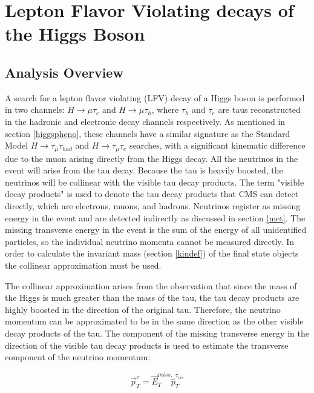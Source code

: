 \documentclass[oneside, letterpaper, oldfontcommands]{memoir}
\begin{document}
\chapter{Lepton Flavor Violating decays of the Higgs Boson}\label{lfv}

\section{Analysis Overview}\label{lfvoverview}
\qquad A search for a lepton flavor violating (LFV) decay of a Higgs boson is performed in two channels: $H \rightarrow \mu\tau_{e}$ and $H \rightarrow \mu\tau_{h}$, where $\tau_{h}$ and $\tau_{e}$ are taus reconstructed in the hadronic and electronic decay channels respectively. As mentioned in section \ref{higgspheno}, these channels have a similar signature as the Standard Model $H \rightarrow \tau_{\mu} \tau_{had}$ and $H \rightarrow \tau_{\mu}\tau_{e}$ searches, with a significant kinematic difference due to the muon arising directly from the Higgs decay. All the neutrinos in the event will arise from the tau decay. Because the tau is heavily boosted, the neutrinos will be collinear with the visible tau decay products. The term "visible decay products" is used to denote the tau decay products that CMS can detect directly, which are electrons, muons, and hadrons. Neutrinos register as missing energy in the event and are detected indirectly as discussed in section \ref{met}. The missing transverse energy in the event is the sum of the energy of all unidentified particles, so the individual neutrino momenta cannot be measured directly. In order to calculate the invariant mass (section \ref{kindef}) of the final state objects the collinear approximation must be used.

\qquad The collinear approximation\cite{Ellis:1987xu} arises from the observation that since the mass of the Higgs is much greater than the mass of the tau, the tau decay products are highly boosted in the direction of the original tau. Therefore, the neutrino momentum can be approximated to be in the same direction as the other visible decay products of the tau. The component of the missing transverse energy in the direction of the visible tau decay products is used to estimate the transverse component of the neutrino momentum:

\begin{equation}
\vec{p}_{T}^{\nu} = \vec{E}_{T}^{miss} \dot \hat{p}_{T}^{\tau_{vis}}
\end{equation}
\end{document}
